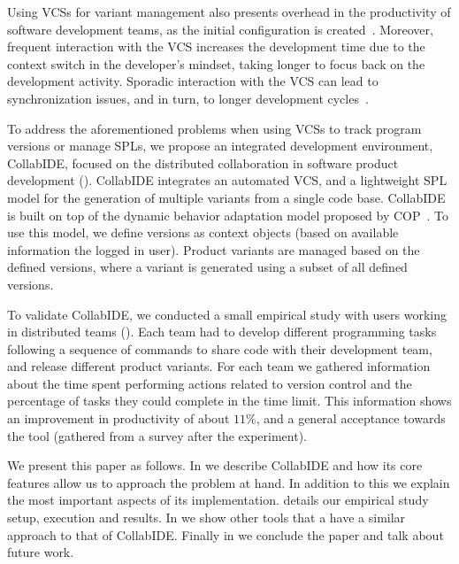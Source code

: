 Using \acp{VCS} for variant management also presents overhead in the productivity of software development teams, as the initial configuration is created~\cite{niu14}.
Moreover, frequent interaction with the \ac{VCS} increases the development time due to the context switch in the developer's mindset, taking longer to focus back on the development activity. Sporadic interaction with the \ac{VCS} can lead to synchronization issues, and in turn, to longer development cycles~\cite{schwagerl15}.  

To address the aforementioned problems when using \acp{VCS} to track program versions or manage \acp{SPL}, we propose an integrated development environment, CollabIDE, focused on the distributed  collaboration in software product development (). CollabIDE integrates an automated \ac{VCS}, and a lightweight \ac{SPL} model for the generation of multiple variants from a single code base. 
CollabIDE is built on top of the dynamic behavior adaptation model proposed by \ac{COP}~\cite{salvaneschi+12survey}. To use this model, we define versions as context objects (based on available information \eg the logged in user).
Product variants are managed based on the defined versions, where a variant is generated using a subset of all defined versions.

To validate CollabIDE, we conducted a small empirical study with users working in distributed teams 
(). Each team had to develop different programming tasks following a sequence of 
commands to share code with their development team, and release different product variants. For each 
team we gathered information about the time spent performing actions related to version control and the 
percentage of tasks they could complete in the time limit. This information shows an improvement in 
productivity of about $11\%$, and a general acceptance towards the tool (gathered from a survey after 
the experiment).

We present this paper as follows. In  we describe CollabIDE and how its core features allow us to approach the problem at hand. In addition to this
we explain the most important aspects of its implementation.  details our empirical study setup, execution and results.
In  we show other tools that a have a similar approach to that of CollabIDE. Finally in  we conclude the paper and talk about future work.
 

\endinput

With CollabIDE, we aim to solve the overhead problems that exists in these development models with 
features that aim to reduce the time developers must spend doing actions related to version control or 
setting up a project that uses \acp{SPL}.
